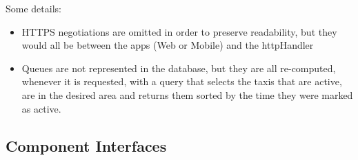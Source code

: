\documentclass{article}
\begin{document}
\begin{figure}[H]
\end{figure}
Some details:
\begin{itemize}
	\item HTTPS negotiations are omitted in order to preserve readability, but they would all be between the apps (Web or Mobile) and the httpHandler %
	\item Queues are not represented in the database, but they are all re-computed, whenever it is requested, with a query that selects the taxis that are active, are in the desired area and returns them sorted by the time they were marked as active.
\end{itemize}
\subsection{Component Interfaces}
\end{document}
